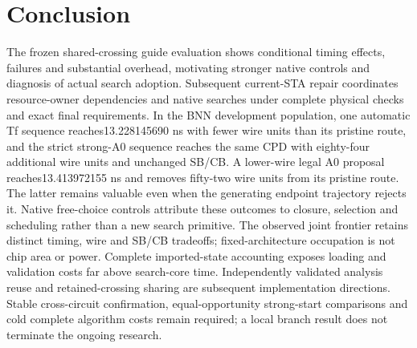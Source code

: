 \documentclass[conference,10pt]{IEEEtran}
\begin{document}
\section{Conclusion}
The frozen shared-crossing guide evaluation shows conditional timing effects, failures and substantial overhead, motivating stronger native controls and diagnosis of actual search adoption. Subsequent current-STA repair coordinates resource-owner dependencies and native searches under complete physical checks and exact final requirements. In the BNN development population, one automatic Tf sequence reaches13.228145690 ns with fewer wire units than its pristine route, and the strict strong-A0 sequence reaches the same CPD with eighty-four additional wire units and unchanged SB/CB. A lower-wire legal A0 proposal reaches13.413972155 ns and removes fifty-two wire units from its pristine route. The latter remains valuable even when the generating endpoint trajectory rejects it. Native free-choice controls attribute these outcomes to closure, selection and scheduling rather than a new search primitive. The observed joint frontier retains distinct timing, wire and SB/CB tradeoffs; fixed-architecture occupation is not chip area or power. Complete imported-state accounting exposes loading and validation costs far above search-core time. Independently validated analysis reuse and retained-crossing sharing are subsequent implementation directions. Stable cross-circuit confirmation, equal-opportunity strong-start comparisons and cold complete algorithm costs remain required; a local branch result does not terminate the ongoing research.

\clearpage


\end{document}
